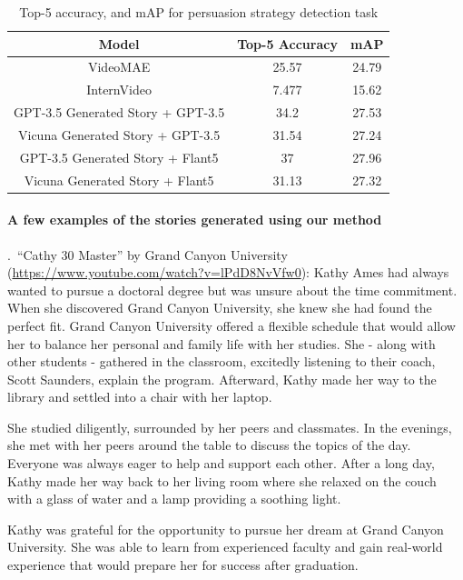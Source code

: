 \begin{table}[!h]
\centering
\begin{adjustbox}{max width=0.8\textwidth}
\begin{tabular}{ccc}
\toprule
Model & Top-5 Accuracy & mAP \\
\midrule
VideoMAE & 25.57 & 24.79 \\
InternVideo & 7.477 & 15.62 \\
GPT-3.5 Generated Story + GPT-3.5 & 34.2 & 27.53 \\
Vicuna Generated Story + GPT-3.5 & 31.54 & 27.24 \\
GPT-3.5 Generated Story + Flant5 & 37 & 27.96 \\
Vicuna Generated Story + Flant5 & 31.13 & 27.32 \\
\bottomrule
\end{tabular}
\end{adjustbox}
\caption{Top-5 accuracy, and mAP for persuasion strategy detection task}
\end{table}





\paragraph{A few examples of the stories generated using our method}
\label{sec:examples-stories-generated}
    .~``Cathy 30 Master'' by Grand Canyon University (\url{https://www.youtube.com/watch?v=lPdD8NvVfw0}): 
    Kathy Ames had always wanted to pursue a doctoral degree but was unsure about the time commitment. When she discovered Grand Canyon University, she knew she had found the perfect fit. Grand Canyon University offered a flexible schedule that would allow her to balance her personal and family life with her studies. She - along with other students - gathered in the classroom, excitedly listening to their coach, Scott Saunders, explain the program. Afterward, Kathy made her way to the library and settled into a chair with her laptop. 
    
    She studied diligently, surrounded by her peers and classmates. In the evenings, she met with her peers around the table to discuss the topics of the day. Everyone was always eager to help and support each other. After a long day, Kathy made her way back to her living room where she relaxed on the couch with a glass of water and a lamp providing a soothing light. 
    
    Kathy was grateful for the opportunity to pursue her dream at Grand Canyon University. She was able to learn from experienced faculty and gain real-world experience that would prepare her for success after graduation. 
    

